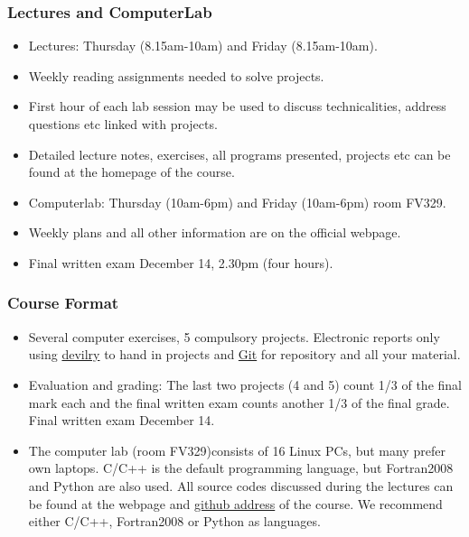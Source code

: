 \documentclass{beamer}
\begin{document}
\begin{frame}
\frametitle{Lectures and ComputerLab}

\begin{block}{}
\begin{itemize}
  \item Lectures: Thursday (8.15am-10am) and Friday (8.15am-10am).

  \item Weekly reading assignments needed to solve projects.

  \item First hour of each lab session may be used to discuss technicalities, address questions etc linked with projects.

  \item Detailed lecture notes, exercises, all programs presented, projects etc can be found at the homepage of the course.

  \item Computerlab: Thursday (10am-6pm) and Friday (10am-6pm) room FV329.

  \item Weekly plans and all other information are on the official webpage.

  \item Final written exam December 14, 2.30pm (four hours).
\end{itemize}

\noindent
\end{block}
\end{frame}

\begin{frame}
\frametitle{Course Format}

\begin{block}{}
\begin{itemize}
  \item Several computer exercises, 5 compulsory projects. Electronic reports only using \href{{https://devilry.ifi.uio.no/}}{devilry} to hand in projects and \href{{https://github.com/}}{Git} for repository and all your material.

  \item Evaluation and grading: The last two projects (4 and 5) count 1/3 of the final mark each  and the  final written exam counts another 1/3 of the final grade. Final written exam December 14.

  \item The computer lab (room FV329)consists of 16 Linux PCs, but many prefer own laptops. C/C++ is the default programming language, but Fortran2008 and Python are also used. All source codes discussed during the lectures can be found at the webpage and \href{{https://github.com/CompPhysics/ComputationalPhysics1}}{github address} of the course. We recommend either C/C++, Fortran2008 or Python as languages.
\end{itemize}

\noindent
\end{block}
\end{frame}
\end{document}
